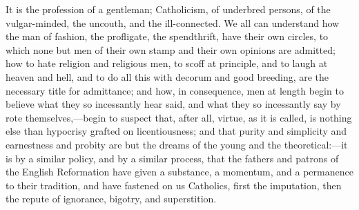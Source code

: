It is the profession of a gentleman; Catholicism, of
underbred persons, of the vulgar-minded, the uncouth, and
the ill-connected. We all can understand how the man of
fashion, the profligate, the spendthrift, have their own
circles, to which none but men of their own stamp and
their own opinions are admitted; how to hate religion and
religious men, to scoff at principle, and to laugh at
heaven and hell, and to do all this with decorum and good
breeding, are the necessary title for admittance; and
how, in consequence, men at length begin to believe what
they so incessantly hear said, and what they so
incessantly say by rote themselves,—begin to suspect
that, after all, virtue, as it is called, is nothing else
than hypocrisy grafted on licentiousness; and that purity
and simplicity and earnestness and probity are but the
dreams of the young and the theoretical:—it is by a
similar policy, and by a similar process, that the
fathers and patrons of the English Reformation have given
a substance, a momentum, and a permanence to their
tradition, and have fastened on us Catholics, first the
imputation, then the repute of ignorance, bigotry, and
superstition.

